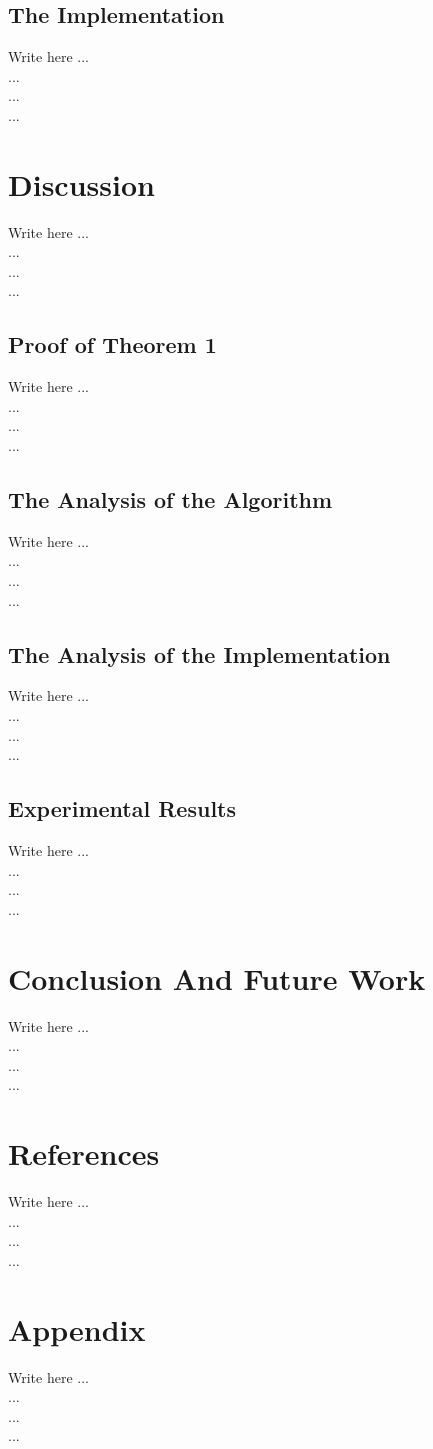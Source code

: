 \documentclass[conference]{IEEEtran}
\begin{document}
\subsection{The Implementation}
    Write here ... \\
    ...  \\
    ...  \\
    ...  

\section{Discussion}

    Write here ... \\
    ...  \\
    ...  \\
    ...  
\subsection*{Proof of Theorem 1}
    Write here ... \\
    ...  \\
    ...  \\
    ...  
    
\subsection{The Analysis of the Algorithm}\label{AA}
    Write here ... \\
    ...  \\
    ...  \\
    ...  

\subsection{The Analysis of the Implementation}
    Write here ... \\
    ...  \\
    ...  \\
    ...  
\subsection{Experimental Results}
    Write here ... \\
    ...  \\
    ...  \\
    ...     


\section{Conclusion And Future Work}
    Write here ... \\
    ...  \\
    ...  \\
    ...   
    
\section*{References}
    Write here ... \\
    ...  \\
    ...  \\
    ...  
    
\section*{Appendix}
    Write here ... \\
    ...  \\
    ...  \\
    ...  
\end{document}
